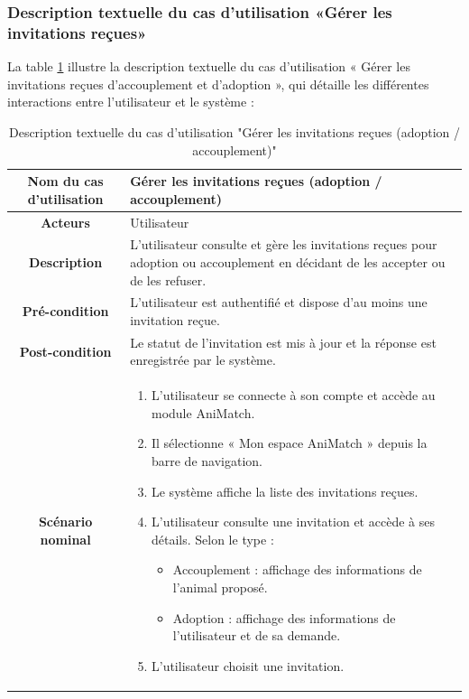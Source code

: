 \subsubsection{ Description textuelle du cas d’utilisation «Gérer les invitations reçues» }   
La table \ref{tab:gerer_invitations} illustre la description textuelle du cas d’utilisation « Gérer les invitations reçues d’accouplement et d’adoption », qui détaille les différentes interactions entre l’utilisateur et le système : 
\begin{longtable}{|c|p{11cm}|}
\caption{Description textuelle du cas d'utilisation "Gérer les invitations reçues (adoption / accouplement)"}
\label{tab:gerer_invitations} \\
\hline
\cellcolor{coloranimatch}\textbf{Nom du cas d'utilisation } & Gérer les invitations reçues (adoption / accouplement) \\
\hline
\cellcolor{coloranimatch}\textbf{Acteurs} & Utilisateur \\
\hline
\cellcolor{coloranimatch}\textbf{Description } & L’utilisateur consulte et gère les invitations reçues pour adoption ou accouplement en décidant de les accepter ou de les refuser. \\
\hline
\cellcolor{coloranimatch}\textbf{Pré-condition } & L’utilisateur est authentifié et dispose d’au moins une invitation reçue. \\
\hline
\cellcolor{coloranimatch}\textbf{Post-condition } & Le statut de l’invitation est mis à jour et la réponse est enregistrée par le système. \\
\hline
\cellcolor{coloranimatch}\textbf{Scénario nominal } &
\begin{enumerate}
\item L’utilisateur se connecte à son compte et accède au module AniMatch.
\item Il sélectionne « Mon espace AniMatch » depuis la barre de navigation.
\item Le système affiche la liste des invitations reçues.
\item L’utilisateur consulte une invitation et accède à ses détails.  
Selon le type :
\begin{itemize}
\item Accouplement : affichage des informations de l’animal proposé.
\item Adoption : affichage des informations de l’utilisateur et de sa demande.
\end{itemize}
\item L’utilisateur choisit une invitation.

\end{enumerate}
\end{longtable}
